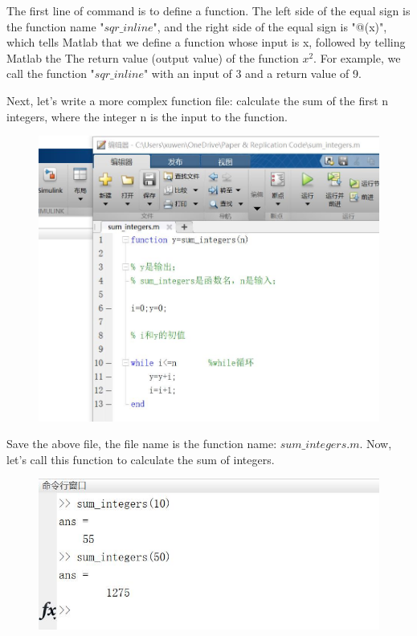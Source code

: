 \documentclass[10pt,math=newtx,citestyle=gb7714-2015,bibstyle=gb7714-2015]{elegantbook}
\begin{document}
{{{	The first line of command is to define a function. The left side of the equal sign is the function name "$sqr\_inline$", and the right side of the equal sign is "@(x)", which tells Matlab that we define a function whose input is x, followed by telling Matlab the The return value (output value) of the function $x^2$. For example, we call the function "$sqr\_inline$" with an input of 3 and a return value of 9.
	
	Next, let's write a more complex function file: calculate the sum of the first n integers, where the integer n is the input to the function.
	
	\begin{figure}[htbp!]
		\centering
		\includegraphics[width=0.8\linewidth]{FIG/sumintegers}
		\centering
	\end{figure}
	
	Save the above file, the file name is the function name: $sum\_integers.m$. Now, let's call this function to calculate the sum of integers.
	
	\begin{figure}[htbp!]
		\centering
		\includegraphics[width=0.8\linewidth]{FIG/sumintegersresults}
		\centering
	\end{figure}
	
}}}
\end{document}
